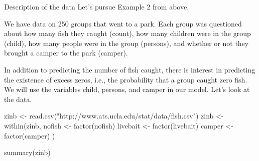 Description of the data
Let's pursue Example 2 from above.

We have data on 250 groups that went to a park. Each group was questioned about how many fish they caught (count), how many children were in the group (child), how many people were in the group (persons), and whether or not they brought a camper to the park (camper).

In addition to predicting the number of fish caught, there is interest in predicting the existence of excess zeros, i.e., the probability that a group caught zero fish. We will use the variables child, persons, and camper in our model. Let's look at the data.

zinb <- read.csv("http://www.ats.ucla.edu/stat/data/fish.csv")
zinb <- within(zinb, {
    nofish <- factor(nofish)
    livebait <- factor(livebait)
    camper <- factor(camper)
})

summary(zinb)
